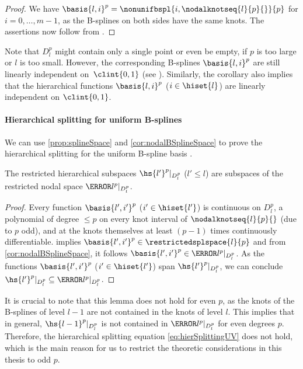 \begin{proof}
  We have $\basis{l,i}^p = \nonunifbspl{i,\nodalknotseq{l}{p}{}}{p}$ for
  $i = 0, \dotsc, m - 1$,
  as the B-splines on both sides have the same knots.
  The assertions now follow from .
\end{proof}

Note that $D_l^p$ might contain only a single point or even be empty,
if $p$ is too large or $l$ is too small.
However, the corresponding B-splines $\basis{l,i}^p$ are still linearly
independent on~$\clint{0, 1}$ (see \cite{Hoellig13Approximation}).
Similarly, the corollary also implies that the hierarchical functions
$\basis{l,i}^p$ ($i \in \hiset{l}$) are linearly independent on $\clint{0, 1}$.

\paragraph{Hierarchical splitting for uniform B-splines}

We can use \cref{prop:splineSpace} and \cref{cor:nodalBSplineSpace}
to prove the hierarchical splitting for the uniform B-spline basis
\cite{Valentin16Hierarchical}.

\begin{lemma}
  The restricted hierarchical subspaces
  $\hs{l'}^p|_{D_l^p}$ ($l' \le l$) are
  subspaces of the restricted nodal space $\ns{l}^p|_{D_l^p}$.
\end{lemma}

\begin{proof}
  Every function $\basis{l',i'}^p$ ($i' \in \hiset{l'}$) is continuous on
  $D_l^p$, a polynomial of degree $\le p$ on every knot interval
  of $\nodalknotseq{l}{p}{}$ (due to $p$ odd),
  and at the knots themselves at least $(p - 1)$ times continuously
  differentiable.
   implies $\basis{l',i'}^p \in \restrictedsplspace{l}{p}$
  and from \cref{cor:nodalBSplineSpace}, it follows
  $\basis{l',i'}^p \in \ns{l}^p|_{D_l^p}$.
  As the functions $\basis{l',i'}^p$ ($i' \in \hiset{l'}$) span
  $\hs{l'}^p|_{D_l^p}$, we can conclude
  $\hs{l'}^p|_{D_l^p} \subset \ns{l}^p|_{D_l^p}$.
\end{proof}

It is crucial to note that this lemma does not hold for even $p$,
as the knots of the B-splines of level $l - 1$ are not contained in the
knots of level $l$.
This implies that in general,
$\hs{l-1}^p|_{D_l^p}$ is not contained in $\ns{l}^p|_{D_l^p}$
for even degrees $p$.
Therefore, the hierarchical splitting equation \eqref{eq:hierSplittingUV}
does not hold, which is the main reason for us to restrict the
theoretic considerations in this thesis to odd $p$.

